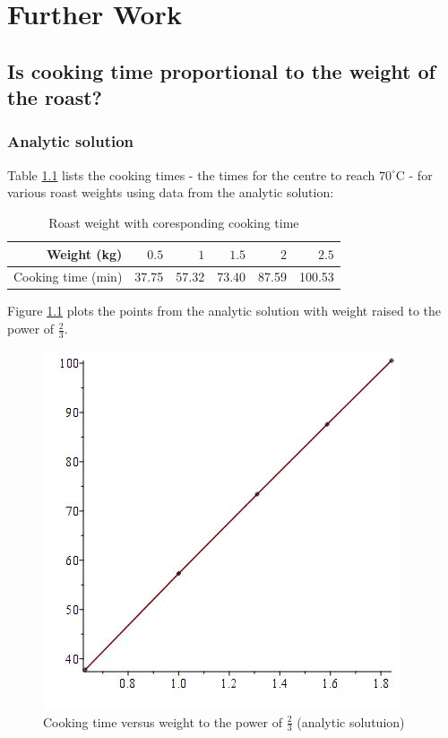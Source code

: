\documentclass{report}
\begin{document}
\chapter{Further Work}\label{chap:further-work}

\section{Is cooking time proportional to the weight of the roast?}

\subsection{Analytic solution}

Table \ref{tab:ctvrw} lists the cooking times - the times for the centre to reach $70^{\circ}\mathrm{C}$ - for various 
roast weights using data from the analytic solution:\bigskip

\begin{table}[h]
\centering
\begin{tabular}{ r | r | r | r | r | r }
Weight (kg) & $0.5$ & $1$ & $1.5$ & $2$ & $2.5$ \\
\hline
Cooking time (min) & 37.75 & 57.32 & 73.40 & 87.59 & 100.53 
\end{tabular}
\caption{Roast weight with coresponding cooking time}
\label{tab:ctvrw}
\end{table}

Figure \ref{fig:ctvw} plots the points from the analytic solution with weight raised to the power of $\frac{2}{3}$.\bigskip

\begin{figure}[h]
\centering
\includegraphics[scale = 0.25]{cooking-time-versus-weight-analytic}
\caption{Cooking time versus weight to the power of $\frac{2}{3}$ (analytic solutuion)}
\label{fig:ctvw}
\end{figure}
\end{document}
